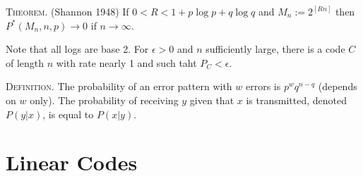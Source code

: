\documentclass{article}
\renewcommand{\=}{\equiv}
\newcommand{\ra}{\rightarrow}
\newcommand{\header}[1]{\vspace{1em}\noindent\textsc{#1.} }
\begin{document}
\header{Theorem} (Shannon 1948)
If $0 < R < 1 + p \log p + q \log q$ and $M_n := 2^{[Rn]}$ then $P^*(M_n, n, p) \ra 0$ if $n \ra \infty$.

Note that all logs are base 2.
For $\epsilon > 0$ and $n$ sufficiently large, there is a code $C$ of length $n$ with rate nearly 1 and such taht $P_C < \epsilon$.

\header{Definition}
The probability of an error pattern with $w$ errors is $p^w q^{n-q}$ (depends on $w$ only).
The probability of receiving $y$ given that $x$ is transmitted, denoted $P(y|x)$, is equal to $P(x|y)$.

\setcounter{section}{2}
\section{Linear Codes}
\end{document}
